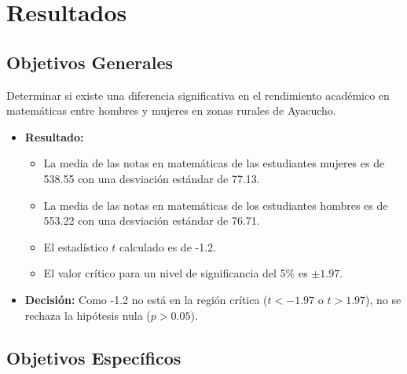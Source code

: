 \documentclass[
]{article}
\begin{document}
\section*{Resultados}\label{resultados}

\subsection*{Objetivos Generales}\label{objetivos-generales}

Determinar si existe una diferencia significativa en el rendimiento
académico en matemáticas entre hombres y mujeres en zonas rurales de
Ayacucho.

\begin{itemize}
  \item \textbf{Resultado:}
    \begin{itemize}
        \item La media de las notas en matemáticas de las estudiantes mujeres es de 538.55 con una desviación estándar de 77.13.
        \item La media de las notas en matemáticas de los estudiantes hombres es de 553.22 con una desviación estándar de 76.71.
        \item El estadístico \( t \) calculado es de -1.2.
        \item El valor crítico para un nivel de significancia del 5\% es \( \pm 1.97 \).
    \end{itemize}
    
  \item \textbf{Decisión:}
    Como -1.2 no está en la región crítica (\( t < -1.97 \) o \( t > 1.97 \)), no se rechaza la hipótesis nula (\( p > 0.05 \)).
\end{itemize}

\subsection*{Objetivos Específicos}\label{objetivos-especuxedficos-1}
\end{document}
